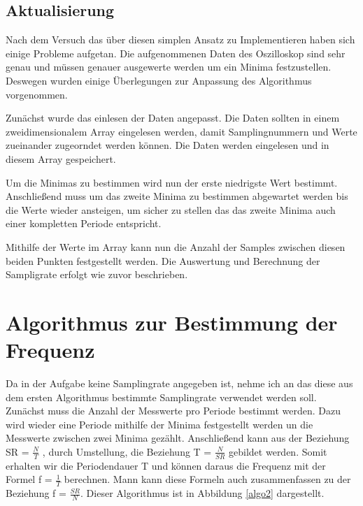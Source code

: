 \subsection{Aktualisierung}
Nach dem Versuch das über diesen simplen Ansatz zu Implementieren haben sich einige Probleme aufgetan.
Die aufgenommenen Daten des Oszilloskop sind sehr genau und müssen genauer ausgewerte werden um ein Minima festzustellen.
Deswegen wurden einige Überlegungen zur Anpassung des Algorithmus vorgenommen.\par
Zunächst wurde das einlesen der Daten angepasst.
Die Daten sollten in einem zweidimensionalem Array eingelesen werden, damit Samplingnummern und Werte zueinander zugeorndet werden können.
Die Daten werden eingelesen und in diesem Array gespeichert.\par
Um die Minimas zu bestimmen wird nun der erste niedrigste Wert bestimmt.
Anschließend muss um das zweite Minima zu bestimmen abgewartet werden bis die Werte wieder ansteigen, um sicher zu stellen das das zweite Minima auch einer kompletten Periode entspricht.\par
Mithilfe der Werte im Array kann nun die Anzahl der Samples zwischen diesen beiden Punkten festgestellt werden.
Die Auswertung und Berechnung der Sampligrate erfolgt wie zuvor beschrieben.\par

\section{Algorithmus zur Bestimmung der Frequenz}
Da in der Aufgabe keine Samplingrate angegeben ist, nehme ich an das diese aus dem ersten Algorithmus bestimmte Samplingrate verwendet werden soll.
Zunächst muss die Anzahl der Messwerte pro Periode bestimmt werden. 
Dazu wird wieder eine Periode mithilfe der Minima festgestellt werden un die Messwerte zwischen zwei Minima gezählt. 
Anschließend kann aus der Beziehung SR = $\frac{N}{T}$ , durch Umstellung, die Beziehung T = $\frac{N}{SR}$ gebildet werden. 
Somit erhalten wir die Periodendauer T und können daraus die Frequenz mit der Formel f = $\frac {1}{T}$ berechnen.
Mann kann diese Formeln auch zusammenfassen zu der Beziehung f = $\frac{SR}{N}.$
Dieser Algorithmus ist in Abbildung \ref{algo2} dargestellt.\par

